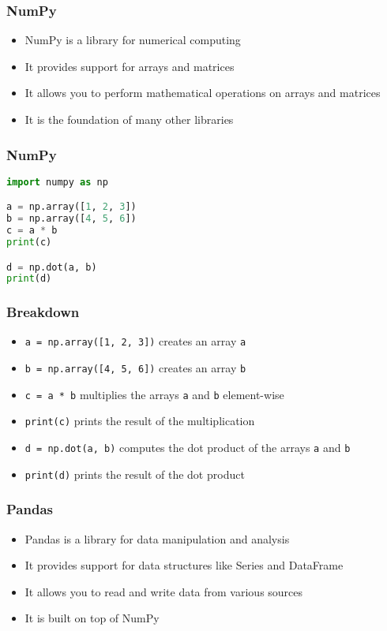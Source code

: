 \documentclass[serif, 9pt, aspectratio=32]{beamer}
\begin{document}
\begin{frame}
    \centering
    \frametitle{NumPy}
    \begin{itemize}
        \setlength{\itemsep}{2em}
        \item NumPy is a library for numerical computing
        \item It provides support for arrays and matrices
        \item It allows you to perform mathematical operations on arrays and matrices
        \item It is the foundation of many other libraries
    \end{itemize}
\end{frame}

\begin{frame}[fragile]
    \frametitle{NumPy}
    \begin{lstlisting}[language=Python]
import numpy as np

a = np.array([1, 2, 3])
b = np.array([4, 5, 6])
c = a * b
print(c)

d = np.dot(a, b)
print(d)
    \end{lstlisting}
\end{frame}

\begin{frame}
    \centering
    \frametitle{Breakdown}
    \begin{itemize}
        \setlength{\itemsep}{2em}
        \item \texttt{a = np.array([1, 2, 3])} creates an array \texttt{a}
        \item \texttt{b = np.array([4, 5, 6])} creates an array \texttt{b}
        \item \texttt{c = a * b} multiplies the arrays \texttt{a} and \texttt{b} element-wise
        \item \texttt{print(c)} prints the result of the multiplication
        \item \texttt{d = np.dot(a, b)} computes the dot product of the arrays \texttt{a} and \texttt{b}
        \item \texttt{print(d)} prints the result of the dot product
    \end{itemize}
\end{frame}

\begin{frame}
    \centering
    \frametitle{Pandas}
    \begin{itemize}
        \setlength{\itemsep}{2em}
        \item Pandas is a library for data manipulation and analysis
        \item It provides support for data structures like Series and DataFrame
        \item It allows you to read and write data from various sources
        \item It is built on top of NumPy
    \end{itemize}
\end{frame}
\end{document}
